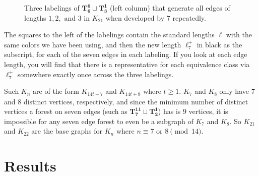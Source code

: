 \begin{figure}[H]
\begin{center}
    \end{center}
    \caption{Three labelings of $\mathbf{T_{6}^{6}}\sqcup \mathbf{T_{3}^{1}}$ (left column) that generate all edges of lengths $1,2,\text{ and }3$ in $K_{21}$ when developed by $7$ repeatedly.}
    \label{fig:K21labelingex}
  \end{figure}

  The squares to the left of the labelings contain the standard lengths $\ell$ with the same colors we have been using, and then the new length $\ell_{7}^{+}$ in black as the subscript, for each of the seven edges in each labeling. If you look at each edge length, you will find that there is a representative for each equivalence class via $\ell_{7}^{+}$ somewhere exactly once across the three labelings.

  Such $K_{n}$ are of the form $K_{14t+7}$ and $K_{14t+8}$ where $t\geq 1$. $K_{7}$ and $K_{8}$ only have $7$ and $8$ distinct vertices, respectively, and since the minimum number of distinct vertices a forest on seven edges (such as $\mathbf{T_{7}^{11}\sqcup T_{2}^{1}}$) has is $9$ vertices, it is impossible for any seven edge forest to even be a subgraph of $K_{7}$ and $K_{8}$. So $K_{21}$ and $K_{22}$ are the base graphs for $K_{n}$ where $n\equiv 7\text{ or }8\pmod{14}$.
\section{Results}\label{sec:7,8result}

